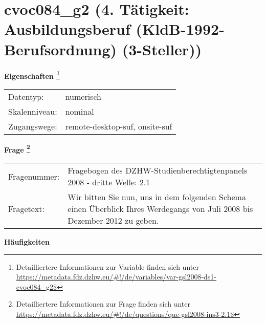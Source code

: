
    \setcounter{footnote}{0}

    \vspace*{-1.8cm}
	\section{cvoc084\_g2 (4. Tätigkeit: Ausbildungsberuf (KldB-1992-Berufsordnung) (3-Steller))}
	\label{section:cvoc084_g2}



    \vspace*{0.5cm}
    \noindent\textbf{Eigenschaften
	\footnote{Detailliertere Informationen zur Variable finden sich unter
		\url{https://metadata.fdz.dzhw.eu/\#!/de/variables/var-gsl2008-ds1-cvoc084_g2$}}}\\
	\begin{tabularx}{\hsize}{@{}lX}
	Datentyp: & numerisch \\
	Skalenniveau: & nominal \\
	Zugangswege: &
	  remote-desktop-suf, 
	  onsite-suf
 \\
    \end{tabularx}



				\vspace*{0.5cm}
                \noindent\textbf{Frage
	                \footnote{Detailliertere Informationen zur Frage finden sich unter
		              \url{https://metadata.fdz.dzhw.eu/\#!/de/questions/que-gsl2008-ins3-2.1$}}}\\
				\begin{tabularx}{\hsize}{@{}lX}
					Fragenummer: &
					  Fragebogen des DZHW-Studienberechtigtenpanels 2008 - dritte Welle:
					  2.1
 \\
					Fragetext: & Wir bitten Sie nun, uns in dem folgenden Schema einen Überblick Ihres Werdegangs von Juli 2008 bis Dezember 2012 zu geben. \\
				\end{tabularx}





        		\vspace*{0.5cm}
                \noindent\textbf{Häufigkeiten}

